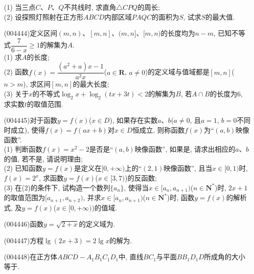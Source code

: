 (1) 当三点$C$、$P$、$Q$不共线时, 求直角$\triangle CPQ$的周长;\\
(2) 设探照灯照射在正方形$ABCD$内部区域$PAQC$的面积为$S$, 试求$S$的最大值.
\item (004444)定义区间$(m,n)$、$[m,n]$、$(m,n]$、$[m,n)$的长度均为$n-m$, 已知不等式$\dfrac 7{6-x}\ge 1$的解集为$A$.\\
(1) 求$A$的长度;\\
(2) 函数$f(x)=\dfrac{(a^2+a)x-1}{a^2x}$($a\in \mathbf{R}$, $a\ne 0$)的定义域与值域都是$[m,n]$($n>m$), 求区间$[m,n]$的最大长度;\\
(3) 关于$x$的不等式$\log_2x+\log_2(tx+3t)<2$的解集为$B$, 若$A\cap B$的长度为$6$, 求实数$t$的取值范围.
\item (004445)对于函数$y=f(x)$($x\in D$), 如果存在实数$a$、$b$($a\ne 0$, 且$a=1$, $b=0$不同时成立), 使得$f(x)=f(ax+b)$对$x\in D$恒成立, 则称函数$f(x)$为``$(a,b)$映像函数''.\\
(1) 判断函数$f(x)=x^2-2$是否是``$(a,b)$映像函数'', 如果是, 请求出相应的$a$、$b$的值, 若不是, 请说明理由;\\
(2) 已知函数$y=f(x)$是定义在$[0,+\infty)$上的``$(2,1)$映像函数'', 且当$x\in [0,1)$时, $f(x)=2^x$, 求函数$y=f(x)$($x\in [3,7)$)的反函数;\\
(3) 在(2)的条件下, 试构造一个数列$\{a_n\}$, 使得当$x\in [a_n,{a_{n+1}})$($n\in \mathbf{N}^*$)时, $2x+1$的取值范围为$[{a_{n+1}},{a_{n+2}})$, 并求$x\in [a_n,{a_{n+1}})$($n\in \mathbf{N}^*$)时, 函数$y=f(x)$的解析式, 及$y=f(x)$($x\in [0,+\infty)$)的值域.
\item (004446)函数$y=\sqrt{2+x}$的定义域为.
\item (004447)方程$\lg(2x+3)=2\lg x$的解为.
\item (004448)在正方体$ABCD-A_1B_1C_1D_1$中, 直线$BC_1$与平面$BB_1D_1D$所成角的大小等于.
\begin{center}
\end{center}
